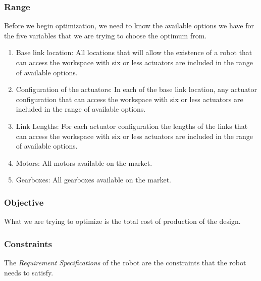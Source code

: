 \documentclass[a4paper,10pt]{article}
\begin{document}
\subsubsection{Range}
Before we begin optimization, we need to know the available options we have for the five variables that we are trying to choose the optimum from. 
\begin{enumerate}
  \item Base link location: All locations that will allow the existence of a robot that can access the workspace with six or less actuators are included in the range of available options.
  \item Configuration of the actuators: In each of the base link location, any actuator configuration that can access the workspace with six or less actuators are included in the range of available options.
  \item Link Lengths: For each actuator configuration the lengths of the links that can access the workspace with six or less actuators are included in the range of available options.
  \item Motors: All motors available on the market.
  \item Gearboxes: All gearboxes available on the market.
\end{enumerate}

\subsubsection{Objective}
What we are trying to optimize is the total cost of production of the design.

\subsubsection{Constraints}
The \emph{Requirement Specifications} of the robot are the constraints that the robot needs to satisfy.
\end{document}
